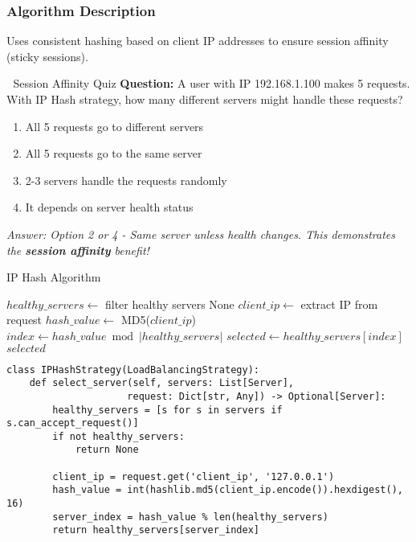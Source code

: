 \documentclass[12pt,a4paper]{article}
\begin{document}
\subsubsection{Algorithm Description}
Uses consistent hashing based on client IP addresses to ensure session affinity (sticky sessions).

\begin{quizbox}{🔐 Session Affinity Quiz}
\textbf{Question:} A user with IP 192.168.1.100 makes 5 requests. With IP Hash strategy, how many different servers might handle these requests?
\begin{enumerate}
    \item All 5 requests go to different servers
    \item All 5 requests go to the same server
    \item 2-3 servers handle the requests randomly
    \item It depends on server health status
\end{enumerate}
\textit{Answer: Option 2 or 4 - Same server unless health changes. This demonstrates the \textbf{session affinity} benefit!}
\end{quizbox}

\begin{algorithm}
\caption{IP Hash Algorithm}
\begin{algorithmic}[1]
    \STATE $healthy\_servers \leftarrow$ filter healthy servers
        \RETURN None
    \ENDIF
    \STATE $client\_ip \leftarrow$ extract IP from request
    \STATE $hash\_value \leftarrow$ MD5($client\_ip$)
    \STATE $index \leftarrow hash\_value \bmod |healthy\_servers|$
    \STATE $selected \leftarrow healthy\_servers[index]$
    \RETURN $selected$
\ENDWHILE
\end{algorithmic}
\end{algorithm}

\begin{lstlisting}[caption=IP Hash Strategy Implementation]
class IPHashStrategy(LoadBalancingStrategy):
    def select_server(self, servers: List[Server], 
                     request: Dict[str, Any]) -> Optional[Server]:
        healthy_servers = [s for s in servers if s.can_accept_request()]
        if not healthy_servers:
            return None
        
        client_ip = request.get('client_ip', '127.0.0.1')
        hash_value = int(hashlib.md5(client_ip.encode()).hexdigest(), 16)
        server_index = hash_value % len(healthy_servers)
        return healthy_servers[server_index]
\end{lstlisting}
\end{document}
